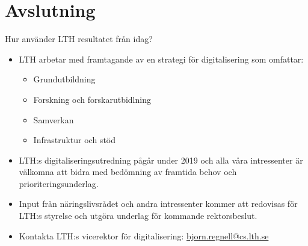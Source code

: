 \documentclass[aspectratio=169]{beamer}
\newenvironment{Slide}[1]%
  {\begin{frame}[environment=Slide]{#1}}
  {\end{frame}}%
\begin{document}
\section{Avslutning}

\begin{Slide}{Hur använder LTH resultatet från idag?}
  \begin{itemize}
    \item LTH arbetar med framtagande av en strategi för digitalisering som omfattar:
    \begin{itemize}
      \item Grundutbildning
      \item Forskning och forskarutbidlning
      \item Samverkan
      \item Infrastruktur och stöd
    \end{itemize}
    \item LTH:s digitaliseringsutredning pågår under 2019 och alla våra intressenter är välkomna att bidra med bedömning av framtida behov och prioriteringsunderlag.
    \item Input från näringslivsrådet och andra intressenter kommer att redovisas för LTH:s styrelse och utgöra underlag för kommande rektorsbeslut. 
    \item Kontakta LTH:s vicerektor för digitalisering: \url{bjorn.regnell@cs.lth.se}
  \end{itemize}
  
\end{Slide}
\end{document}
